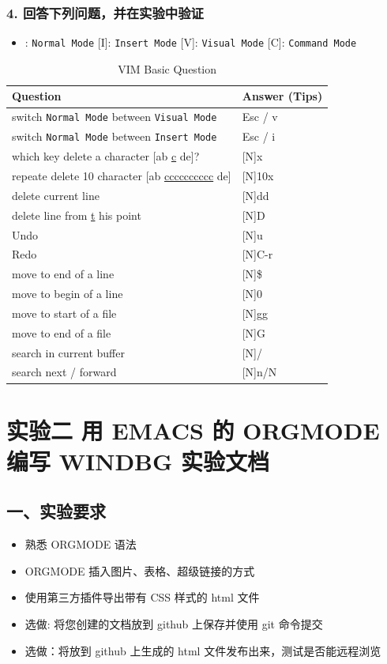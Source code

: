 \documentclass[UTF8]{ctexart}
\begin{document}
\subsubsection*{4. 回答下列问题，并在实验中验证}
\label{sec:org571b624}

\begin{itemize}
\item\relax [N]: \texttt{Normal Mode} [I]: \texttt{Insert Mode} [V]: \texttt{Visual Mode} [C]: \texttt{Command Mode}
\end{itemize}

\begin{table}[htbp]
\caption{VIM Basic Question}
\centering
\begin{tabular}{ll}
Question & Answer (Tips)\\
\hline
switch \texttt{Normal Mode} between \texttt{Visual Mode} & Esc / v\\
switch \texttt{Normal Mode} between \texttt{Insert Mode} & Esc / i\\
which key delete a character [ab \uline{c} de]? & [N]x\\
repeate delete 10 character [ab \uline{cccccccccc} de] & [N]10x\\
delete current line & [N]dd\\
delete line from \uline{t} his point & [N]D\\
Undo & [N]u\\
Redo & [N]C-r\\
move to end of a line & [N]\$\\
move to begin of a line & [N]0\\
move to start of a file & [N]gg\\
move to end of a file & [N]G\\
search in current buffer & [N]/\\
search next / forward & [N]n/N\\
\end{tabular}
\end{table}

\section*{实验二 用 EMACS 的 ORGMODE 编写 WINDBG 实验文档}
\label{sec:org3117558}
\subsection*{一、实验要求}
\label{sec:org38ea837}
\begin{itemize}
\item 熟悉 ORGMODE 语法
\item ORGMODE 插入图片、表格、超级链接的方式
\item 使用第三方插件导出带有 CSS 样式的 html 文件
\item 选做: 将您创建的文档放到 github 上保存并使用 git 命令提交
\item 选做：将放到 github 上生成的 html 文件发布出来，测试是否能远程浏览
\end{itemize}
\end{document}
